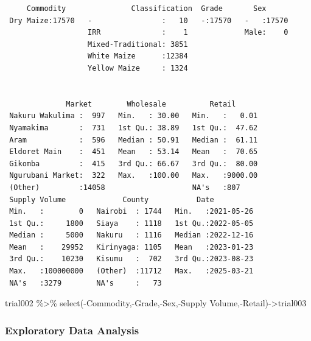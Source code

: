 \documentclass[
  letterpaper,
  DIV=11,
  numbers=noendperiod]{scrartcl}
\newenvironment{Shaded}{\begin{snugshade}}{\end{snugshade}}
\newcommand{\AttributeTok}[1]{\textcolor[rgb]{0.40,0.45,0.13}{#1}}
\newcommand{\FunctionTok}[1]{\textcolor[rgb]{0.28,0.35,0.67}{#1}}
\newcommand{\NormalTok}[1]{\textcolor[rgb]{0.00,0.23,0.31}{#1}}
\newcommand{\OtherTok}[1]{\textcolor[rgb]{0.00,0.23,0.31}{#1}}
\newcommand{\SpecialCharTok}[1]{\textcolor[rgb]{0.37,0.37,0.37}{#1}}
\newcommand{\StringTok}[1]{\textcolor[rgb]{0.13,0.47,0.30}{#1}}
\begin{document}
\begin{verbatim}
     Commodity               Classification  Grade       Sex       
 Dry Maize:17570   -                :   10   -:17570   -   :17570  
                   IRR              :    1             Male:    0  
                   Mixed-Traditional: 3851                         
                   White Maize      :12384                         
                   Yellow Maize     : 1324                         
                                                                   
                                                                   
              Market        Wholesale          Retail       
 Nakuru Wakulima :  997   Min.   : 30.00   Min.   :   0.01  
 Nyamakima       :  731   1st Qu.: 38.89   1st Qu.:  47.62  
 Aram            :  596   Median : 50.91   Median :  61.11  
 Eldoret Main    :  451   Mean   : 53.14   Mean   :  70.65  
 Gikomba         :  415   3rd Qu.: 66.67   3rd Qu.:  80.00  
 Ngurubani Market:  322   Max.   :100.00   Max.   :9000.00  
 (Other)         :14058                    NA's   :807      
 Supply Volume             County           Date           
 Min.   :        0   Nairobi  : 1744   Min.   :2021-05-26  
 1st Qu.:     1800   Siaya    : 1118   1st Qu.:2022-05-05  
 Median :     5000   Nakuru   : 1116   Median :2022-12-16  
 Mean   :    29952   Kirinyaga: 1105   Mean   :2023-01-23  
 3rd Qu.:    10230   Kisumu   :  702   3rd Qu.:2023-08-23  
 Max.   :100000000   (Other)  :11712   Max.   :2025-03-21  
 NA's   :3279        NA's     :   73                       
\end{verbatim}

\begin{Shaded}
\begin{Highlighting}[]
\NormalTok{trial002 }\SpecialCharTok{\%\textgreater{}\%} \FunctionTok{select}\NormalTok{(}\SpecialCharTok{{-}}\NormalTok{Commodity,}\SpecialCharTok{{-}}\NormalTok{Grade,}\SpecialCharTok{{-}}\NormalTok{Sex,}\SpecialCharTok{{-}}\StringTok{\textasciigrave{}}\AttributeTok{Supply Volume}\StringTok{\textasciigrave{}}\NormalTok{,}\SpecialCharTok{{-}}\NormalTok{Retail)}\OtherTok{{-}\textgreater{}}\NormalTok{trial003}
\end{Highlighting}
\end{Shaded}

\subsubsection{Exploratory Data
Analysis}\label{exploratory-data-analysis}
\end{document}
